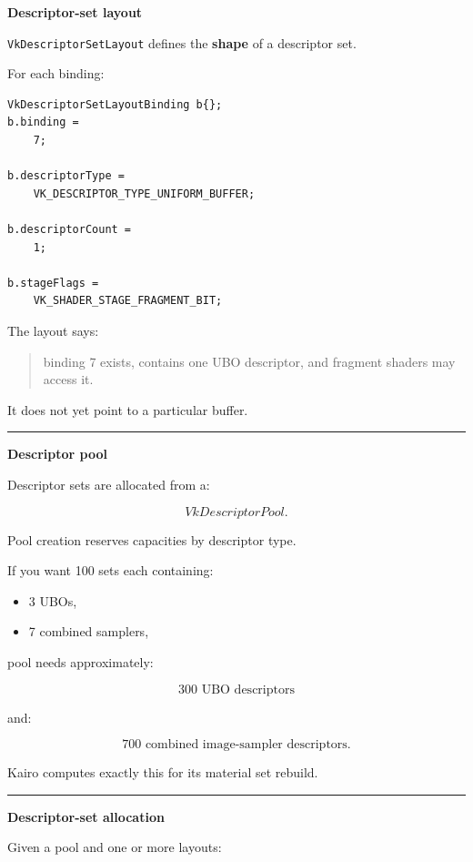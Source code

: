 \textbf{Descriptor-set layout}

\texttt{VkDescriptorSetLayout} defines the \textbf{shape} of a descriptor set.

For each binding:

\begin{verbatim}
VkDescriptorSetLayoutBinding b{};
b.binding =
    7;

b.descriptorType =
    VK_DESCRIPTOR_TYPE_UNIFORM_BUFFER;

b.descriptorCount =
    1;

b.stageFlags =
    VK_SHADER_STAGE_FRAGMENT_BIT;
\end{verbatim}

The layout says:

\begin{quote}
binding 7 exists, contains one UBO descriptor, and fragment shaders may access it.
\end{quote}

It does not yet point to a particular buffer.

\begin{center}\rule{0.5\linewidth}{0.5pt}\end{center}

\textbf{Descriptor pool}

Descriptor sets are allocated from a:

\[
VkDescriptorPool.
\]

Pool creation reserves capacities by descriptor type.

If you want 100 sets each containing:

\begin{itemize}
\tightlist
\item
  3 UBOs,
\item
  7 combined samplers,
\end{itemize}

pool needs approximately:

\[
300\text{ UBO descriptors}
\]

and:

\[
700\text{ combined image-sampler descriptors}.
\]

Kairo computes exactly this for its material set rebuild.

\begin{center}\rule{0.5\linewidth}{0.5pt}\end{center}

\textbf{Descriptor-set allocation}

Given a pool and one or more layouts:

